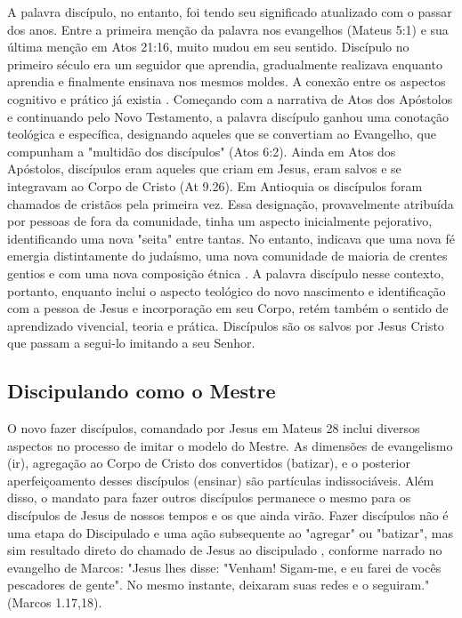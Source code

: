 \documentclass[12pt,openright,oneside,a4paper]{abntex2}
\begin{document}
A palavra discípulo, no entanto, foi tendo seu significado atualizado com o passar dos anos. Entre a primeira menção da palavra nos evangelhos (Mateus 5:1) e sua última menção em Atos 21:16, muito mudou em seu sentido. Discípulo no primeiro século era um seguidor que aprendia, gradualmente realizava enquanto aprendia e finalmente ensinava nos mesmos moldes. A conexão entre os aspectos cognitivo e prático já existia \cite[p. 105]{wilkins}. Começando com a narrativa de Atos dos Apóstolos e continuando pelo Novo Testamento, a palavra discípulo ganhou uma conotação teológica e específica, designando aqueles que se convertiam ao Evangelho, que compunham a "multidão dos discípulos" (Atos 6:2). Ainda em Atos dos Apóstolos, discípulos eram aqueles que criam em Jesus, eram salvos e se integravam ao Corpo de Cristo (At 9.26)\cite[p. 59-60]{brandao}. Em Antioquia os discípulos foram chamados de cristãos pela primeira vez. Essa designação, provavelmente atribuída por pessoas de fora da comunidade, tinha um aspecto inicialmente pejorativo, identificando uma nova "seita" entre tantas. No entanto, indicava que uma nova fé emergia distintamente do judaísmo, uma nova comunidade de maioria de crentes gentios e com uma nova composição étnica \cite[p. 90]{wan_diaspora_2011}. A palavra discípulo nesse contexto, portanto, enquanto inclui o aspecto teológico do novo nascimento e identificação com a pessoa de Jesus e incorporação em seu Corpo, retém também o sentido de aprendizado vivencial, teoria e prática. Discípulos são os salvos por Jesus Cristo que passam a segui-lo imitando a seu Senhor.

\subsection{Discipulando como o Mestre}


O novo fazer discípulos, comandado por Jesus em Mateus 28 inclui diversos aspectos no processo de imitar o modelo do Mestre. As dimensões de evangelismo (ir), agregação ao Corpo de Cristo dos convertidos (batizar), e o posterior aperfeiçoamento desses discípulos (ensinar) são partículas indissociáveis. Além disso, o mandato para fazer outros discípulos permanece o mesmo para os discípulos de Jesus de nossos tempos e os que ainda virão. Fazer discípulos não é uma etapa do Discipulado e uma ação subsequente ao "agregar" ou "batizar", mas sim resultado direto do chamado de Jesus ao discipulado \cite[p. 64]{brandao}, conforme narrado no evangelho de Marcos: "Jesus lhes disse: "Venham! Sigam-me, e eu farei de vocês pescadores de gente". No mesmo instante, deixaram suas redes e o seguiram."(Marcos 1.17,18).
\end{document}
